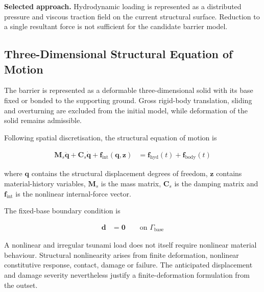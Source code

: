 \textbf{Selected approach.} Hydrodynamic loading is represented as a distributed pressure and viscous traction field on the current structural surface. Reduction to a single resultant force is not sufficient for the candidate barrier model.



\subsection{Three-Dimensional Structural Equation of Motion}
\label{subsec:res_str_rsp_three_dimensional_eom}

The barrier is represented as a deformable three-dimensional solid with its base fixed or bonded to the supporting ground. Gross rigid-body translation, sliding and overturning are excluded from the initial model, while deformation of the solid remains admissible.

Following spatial discretisation, the structural equation of motion is

\begin{align}
\bm{M}_{s}\ddot{\bm{q}}
+
\bm{C}_{s}\dot{\bm{q}}
+
\bm{f}_{\mathrm{int}}\!\left(\bm{q},\bm{z}\right)
&=
\bm{f}_{\mathrm{hyd}}(t)
+
\bm{f}_{\mathrm{body}}(t)
\label{eq:res_str_rsp_structural_eom}
\end{align}

where \(\bm{q}\) contains the structural displacement degrees of freedom, \(\bm{z}\) contains material-history variables, \(\bm{M}_{s}\) is the mass matrix, \(\bm{C}_{s}\) is the damping matrix and \(\bm{f}_{\mathrm{int}}\) is the nonlinear internal-force vector.

The fixed-base boundary condition is

\begin{align}
\bm{d}
&=
\bm{0}
\qquad
\text{on }\Gamma_{\mathrm{base}}
\label{eq:res_str_rsp_fixed_base_boundary}
\end{align}

A nonlinear and irregular tsunami load does not itself require nonlinear material behaviour. Structural nonlinearity arises from finite deformation, nonlinear constitutive response, contact, damage or failure. The anticipated displacement and damage severity nevertheless justify a finite-deformation formulation from the outset.

